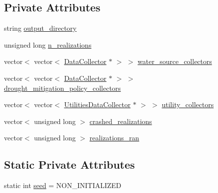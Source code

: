\subsection*{Private Attributes}
\begin{DoxyCompactItemize}
\item 
string \mbox{\hyperlink{classMasterDataCollector_af49386aa4a7ab28e11216055aecc596c_af49386aa4a7ab28e11216055aecc596c}{output\+\_\+directory}}
\item 
unsigned long \mbox{\hyperlink{classMasterDataCollector_a2c6a150ee1d489a225d2f1c7b654798d_a2c6a150ee1d489a225d2f1c7b654798d}{n\+\_\+realizations}}
\item 
vector$<$ vector$<$ \mbox{\hyperlink{classDataCollector}{Data\+Collector}} $\ast$ $>$ $>$ \mbox{\hyperlink{classMasterDataCollector_a31899d6d3b2f7106cbacf7c3dd0e46c0_a31899d6d3b2f7106cbacf7c3dd0e46c0}{water\+\_\+source\+\_\+collectors}}
\item 
vector$<$ vector$<$ \mbox{\hyperlink{classDataCollector}{Data\+Collector}} $\ast$ $>$ $>$ \mbox{\hyperlink{classMasterDataCollector_a3753307a042d155d3e7d7db095c0be7e_a3753307a042d155d3e7d7db095c0be7e}{drought\+\_\+mitigation\+\_\+policy\+\_\+collectors}}
\item 
vector$<$ vector$<$ \mbox{\hyperlink{classUtilitiesDataCollector}{Utilities\+Data\+Collector}} $\ast$ $>$ $>$ \mbox{\hyperlink{classMasterDataCollector_a9482c829e7306ea318b237f52a6dbbf0_a9482c829e7306ea318b237f52a6dbbf0}{utility\+\_\+collectors}}
\item 
vector$<$ unsigned long $>$ \mbox{\hyperlink{classMasterDataCollector_a4a11d30216e284aa7adc19b730bde2f5_a4a11d30216e284aa7adc19b730bde2f5}{crashed\+\_\+realizations}}
\item 
vector$<$ unsigned long $>$ \mbox{\hyperlink{classMasterDataCollector_a85bcb6c159366dd5fb3f0baeda2f2b2f_a85bcb6c159366dd5fb3f0baeda2f2b2f}{realizations\+\_\+ran}}
\end{DoxyCompactItemize}
\subsection*{Static Private Attributes}
\begin{DoxyCompactItemize}
\item 
static int \mbox{\hyperlink{classMasterDataCollector_a6cdbb4443f1425000f837231d662249e_a6cdbb4443f1425000f837231d662249e}{seed}} = N\+O\+N\+\_\+\+I\+N\+I\+T\+I\+A\+L\+I\+Z\+ED
\end{DoxyCompactItemize}


